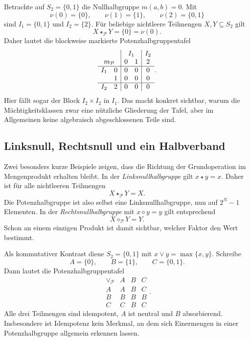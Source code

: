 \documentclass[main.tex]{subfiles}
\begin{document}
Betrachte auf \(S_2=\{0,1\}\) die Nullhalbgruppe \(m(a,b)=0\).  Mit
\[
  \nu(0)=\{0\},
  \qquad
  \nu(1)=\{1\},
  \qquad
  \nu(2)=\{0,1\}
\]
sind \(I_1=\{0,1\}\) und \(I_2=\{2\}\).  Für beliebige nichtleere
Teilmengen \(X,Y\subseteq S_2\) gilt
\[
  X\star_{\mathcal P}Y=\{0\}=\nu(0).
\]
Daher lautet die blockweise markierte Potenzhalbgruppentafel
\[
\begin{array}{cc|cc|c}
\multicolumn{2}{c|}{}
  &\multicolumn{2}{c|}{I_1}
  &\multicolumn{1}{c}{I_2}\\
\multicolumn{2}{c|}{m_{\mathcal P}}&0&1&2\\\hline
I_1&0&0&0&0\\
   &1&0&0&0\\\hline
I_2&2&0&0&0
\end{array}.
\]
Hier fällt sogar der Block \(I_2\times I_2\) in \(I_1\).  Das macht konkret
sichtbar, warum die Mächtigkeitsklassen zwar eine nützliche Gliederung der
Tafel, aber im Allgemeinen keine algebraisch abgeschlossenen Teile sind.

\subsection{Linksnull, Rechtsnull und ein Halbverband}

Zwei besonders kurze Beispiele zeigen, dass die Richtung der Grundoperation
im Mengenprodukt erhalten bleibt.  In der \emph{Linksnullhalbgruppe} gilt
\(x\star y=x\).  Daher ist für alle nichtleeren Teilmengen
\[
  X\star_{\mathcal P}Y=X.
\]
Die Potenzhalbgruppe ist also selbst eine Linksnullhalbgruppe, nun auf
\(2^N-1\) Elementen.  In der \emph{Rechtsnullhalbgruppe} mit
\(x\diamond y=y\) gilt entsprechend
\[
  X\diamond_{\mathcal P}Y=Y.
\]
Schon an einem einzigen Produkt ist damit sichtbar, welcher Faktor den Wert
bestimmt.

Als kommutativer Kontrast diene \(S_2=\{0,1\}\) mit
\(x\vee y=\max\{x,y\}\).  Schreibe
\[
  A=\{0\},\qquad B=\{1\},\qquad C=\{0,1\}.
\]
Dann lautet die Potenzhalbgruppentafel
\[
\begin{array}{c|ccc}
\vee_{\mathcal P}&A&B&C\\\hline
A&A&B&C\\
B&B&B&B\\
C&C&B&C
\end{array}.
\]
Alle drei Teilmengen sind idempotent, \(A\) ist neutral und \(B\)
absorbierend.  Insbesondere ist Idempotenz kein Merkmal, an dem sich
Einermengen in einer Potenzhalbgruppe allgemein erkennen lassen.
\end{document}
